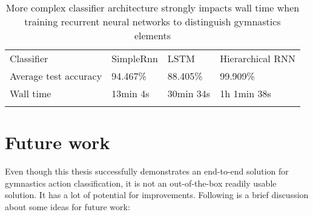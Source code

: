 \begin{table}[htb]
\begin{tabular}{llll}
Classifier            & SimpleRnn & LSTM      & Hierarchical RNN  \\
Average test accuracy & 94.467\%  & 88.405\%  &  99.909\%         \\
Wall time             & 13min 4s  & 30min 34s & 1h 1min 38s       \\
 &  &  &  
\end{tabular}
\caption{More complex classifier architecture strongly impacts wall time when training recurrent neural networks to distinguish gymnastics elements}
\label{classifier-wall-time}
\end{table}

\section{Future work}

Even though this thesis successfully demonstrates an end-to-end solution for gymnastics action classification, it is not an out-of-the-box readily usable solution. It has a lot of potential for improvements. Following is a brief discussion about some ideas for future work:

